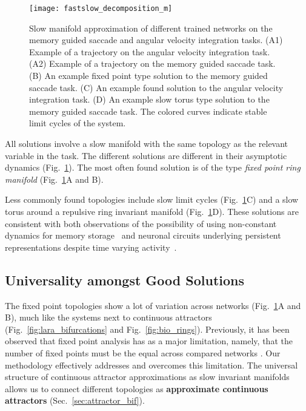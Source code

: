 \documentclass{article} %
\newcounter{ct}
\theoremstyle{definition}
\theoremstyle{remark}
\begin{document}
\begin{figure}[tbhp]
  \centering
  \texttt{[image: fastslow\_decomposition\_m]}
  \caption{Slow manifold approximation of different trained networks on the memory guided saccade and angular velocity integration tasks.
 (A1) Example of a trajectory on the  angular velocity integration task.
 (A2) Example of a trajectory on the  memory guided saccade task.
 (B) An example fixed point type solution to the memory guided saccade task.
 (C) An example found solution to the angular velocity integration task.
 (D) An example slow torus type solution to the memory guided saccade task. The colored curves indicate stable limit cycles of the system.
}
  \label{fig:fastslow_decomposition}
\end{figure}

All solutions involve a slow manifold with the same topology as the relevant variable in the task.
The different solutions are different in their asymptotic dynamics (Fig.~\ref{fig:fastslow_decomposition}).
The most often found solution is of the type \emph{fixed point ring manifold} (Fig.~\ref{fig:fastslow_decomposition}A and B).

Less commonly found topologies include slow limit cycles (Fig.~\ref{fig:fastslow_decomposition}C) and a slow torus around a repulsive ring invariant manifold (Fig.~\ref{fig:fastslow_decomposition}D).
These solutions are consistent with both observations of the possibility of using non-constant dynamics for memory storage~\citep{hirsch1995computing,Park2023a} and neuronal circuits underlying persistent representations despite time varying activity~\citep{druckmann2012neuronal}.

\subsection{Universality amongst Good Solutions}

The fixed point topologies show a lot of variation across networks (Fig.~\ref{fig:fastslow_decomposition}A and B),
 much like the systems next to continuous attractors (Fig.~\ref{fig:lara_bifurcations} and Fig.~\ref{fig:bio_rings}).
Previously, it has been observed that  fixed point analysis  has as a major limitation, namely, that the number of fixed points must be the equal across compared networks  \citep{maheswaranathan2019universality}.
Our methodology effectively addresses and overcomes this limitation.
The universal structure of continuous attractor approximations as slow invariant manifolds allows us to connect different topologies as \textbf{approximate continuous attractors} (Sec.~\ref{sec:attractor_bif}).
\end{document}
